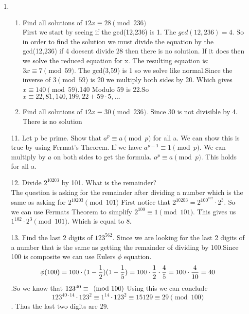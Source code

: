 \documentclass[12pt]{article}
\begin{document}
\begin{enumerate}
\begin{enumerate}
          \end{enumerate}
    \item \begin{enumerate}
              \item Find all solutions of $12x \equiv 28 \pmod{236}$\\
                    First we start by seeing if the gcd(12,236) is 1. The $gcd(12,236) = 4$. So in order to find the solution we must divide the equation by the gcd(12,236) if 4 doesent divide 28 then there is no solution. If it does then we solve the reduced equation for x. The resulting equation is:$3x \equiv 7 \pmod{59}$. The gcd(3,59) is 1 so we solve like normal.Since the inverse of $3\pmod{59}$ is 20 we multiply both sides by 20. Which gives $x\equiv 140 \pmod{59}$.140 Modulo 59 is 22.So $x \equiv 22,81,140,199,22+59\cdot 5, \dots$
              \item Find all solutions of $12x \equiv 30 \pmod{236}$. Since 30  is not divisible by 4. There is no solution
          \end{enumerate}

    \item[11.] Let p be prime. Show that $a^p \equiv a \pmod{p}$ for all a.
          We can show this is true by using Fermat's Theorem. If we have $a^{p-1} \equiv 1 \pmod{p}$. We can multiply by $a$ on both sides to get the formula. $a^p \equiv a \pmod{p}$. This holds for all a.
    \item[12.] Divide $2^{10203}$ by 101. What is the remainder?\\
          The question is asking for the remainder after dividing a number which is the same as asking for $2^{10203} \pmod{101}$
          First notice that $2^{10203} = 2^{100^{102}} \cdot 2^3$. So we can use Fermats Theorem to simplify $2^{100} \equiv 1 \pmod{101}$. This gives us $1^{102} \cdot 2^3 \pmod{101}$. Which is equal to 8.
    \item[13.] Find the last 2 digits of $123^{562}$.
          Since we are looking for the last 2 digits of a number that is the same as getting the remainder of dividing by 100.Since 100 is composite we can use Eulers $\phi$ equation.\[
            \phi(100) = 100 \cdot (1-\frac{1}{2})(1- \frac{1}{5}) = 100 \cdot \frac{1}{2} \cdot \frac{4}{5}= 100 \cdot \frac{4}{10} = 40 \\
          \].So we know that $123^{40} \equiv \pmod{100}\\$ Using this we can conclude \[
                123^{40 \cdot 14}\cdot 123^2 \equiv 1^{14} \cdot 123^2   \equiv 15129 \equiv 29 \pmod{100}
          \]. Thus the last two digits are 29.
          
\end{enumerate}
\end{document}
